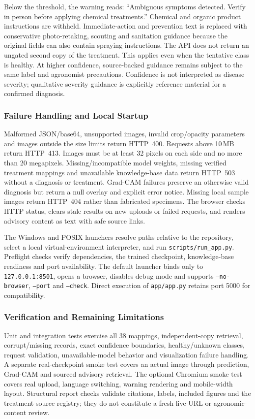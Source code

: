 Below the threshold, the warning reads: ``Ambiguous symptoms detected. Verify in person before applying chemical treatments.'' Chemical and organic product instructions are withheld. Immediate-action and prevention text is replaced with conservative photo-retaking, scouting and sanitation guidance because the original fields can also contain spraying instructions. The API does not return an ungated second copy of the treatment. This applies even when the tentative class is healthy. At higher confidence, source-backed guidance remains subject to the same label and agronomist precautions. Confidence is not interpreted as disease severity; qualitative severity guidance is explicitly reference material for a confirmed diagnosis.

\subsubsection{Failure Handling and Local Startup}
Malformed JSON/base64, unsupported images, invalid crop/opacity parameters and images outside the size limits return HTTP~400. Requests above 10\,MB return HTTP~413. Images must be at least 32 pixels on each side and no more than 20 megapixels. Missing/incompatible model weights, missing verified treatment mappings and unavailable knowledge-base data return HTTP~503 without a diagnosis or treatment. Grad-CAM failures preserve an otherwise valid diagnosis but return a null overlay and explicit error notice. Missing local sample images return HTTP~404 rather than fabricated specimens. The browser checks HTTP status, clears stale results on new uploads or failed requests, and renders advisory content as text with safe source links.

The Windows and POSIX launchers resolve paths relative to the repository, select a local virtual-environment interpreter, and run \texttt{scripts/run\_app.py}. Preflight checks verify dependencies, the trained checkpoint, knowledge-base readiness and port availability. The default launcher binds only to \texttt{127.0.0.1:8501}, opens a browser, disables debug mode and supports \texttt{--no-browser}, \texttt{--port} and \texttt{--check}. Direct execution of \texttt{app/app.py} retains port 5000 for compatibility.

\subsubsection{Verification and Remaining Limitations}
Unit and integration tests exercise all 38 mappings, independent-copy retrieval, corrupt/missing records, exact confidence boundaries, healthy/unknown classes, request validation, unavailable-model behavior and visualization failure handling. A separate real-checkpoint smoke test covers an actual image through prediction, Grad-CAM and sourced advisory retrieval. The optional Chromium smoke test covers real upload, language switching, warning rendering and mobile-width layout. Structural report checks validate citations, labels, included figures and the treatment-source registry; they do not constitute a fresh live-URL or agronomic-content review.

